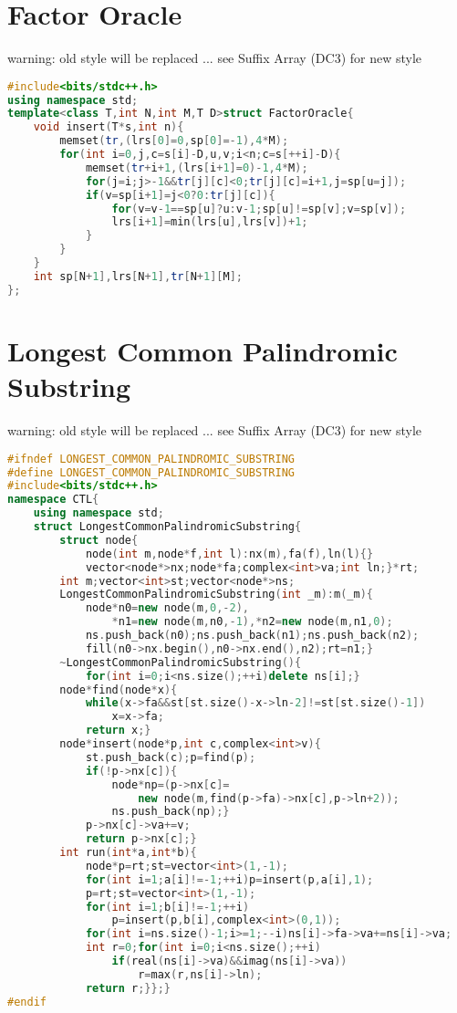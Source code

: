 \documentclass{book}
\begin{document}
\section{Factor Oracle}
warning: old style will be replaced ... see Suffix Array (DC3) for new style\begin{lstlisting}[language=C++,title={Factor Oracle.hpp (569 bytes, 16 lines)}]
#include<bits/stdc++.h>
using namespace std;
template<class T,int N,int M,T D>struct FactorOracle{
    void insert(T*s,int n){
        memset(tr,(lrs[0]=0,sp[0]=-1),4*M);
        for(int i=0,j,c=s[i]-D,u,v;i<n;c=s[++i]-D){
            memset(tr+i+1,(lrs[i+1]=0)-1,4*M);
            for(j=i;j>-1&&tr[j][c]<0;tr[j][c]=i+1,j=sp[u=j]);
            if(v=sp[i+1]=j<0?0:tr[j][c]){
                for(v=v-1==sp[u]?u:v-1;sp[u]!=sp[v];v=sp[v]);
                lrs[i+1]=min(lrs[u],lrs[v])+1;
            }
        }
    }
    int sp[N+1],lrs[N+1],tr[N+1][M];
};
\end{lstlisting}
\section{Longest Common Palindromic Substring}
warning: old style will be replaced ... see Suffix Array (DC3) for new style\begin{lstlisting}[language=C++,title={Longest Common Palindromic Substring.hpp (1752 bytes, 41 lines)}]
#ifndef LONGEST_COMMON_PALINDROMIC_SUBSTRING
#define LONGEST_COMMON_PALINDROMIC_SUBSTRING
#include<bits/stdc++.h>
namespace CTL{
    using namespace std;
    struct LongestCommonPalindromicSubstring{
        struct node{
            node(int m,node*f,int l):nx(m),fa(f),ln(l){}
            vector<node*>nx;node*fa;complex<int>va;int ln;}*rt;
        int m;vector<int>st;vector<node*>ns;
        LongestCommonPalindromicSubstring(int _m):m(_m){
            node*n0=new node(m,0,-2),
                *n1=new node(m,n0,-1),*n2=new node(m,n1,0);
            ns.push_back(n0);ns.push_back(n1);ns.push_back(n2);
            fill(n0->nx.begin(),n0->nx.end(),n2);rt=n1;}
        ~LongestCommonPalindromicSubstring(){
            for(int i=0;i<ns.size();++i)delete ns[i];}
        node*find(node*x){
            while(x->fa&&st[st.size()-x->ln-2]!=st[st.size()-1])
                x=x->fa;
            return x;}
        node*insert(node*p,int c,complex<int>v){
            st.push_back(c);p=find(p);
            if(!p->nx[c]){
                node*np=(p->nx[c]=
                    new node(m,find(p->fa)->nx[c],p->ln+2));
                ns.push_back(np);}
            p->nx[c]->va+=v;
            return p->nx[c];}
        int run(int*a,int*b){
            node*p=rt;st=vector<int>(1,-1);
            for(int i=1;a[i]!=-1;++i)p=insert(p,a[i],1);
            p=rt;st=vector<int>(1,-1);
            for(int i=1;b[i]!=-1;++i)
                p=insert(p,b[i],complex<int>(0,1));
            for(int i=ns.size()-1;i>=1;--i)ns[i]->fa->va+=ns[i]->va;
            int r=0;for(int i=0;i<ns.size();++i)
                if(real(ns[i]->va)&&imag(ns[i]->va))
                    r=max(r,ns[i]->ln);
            return r;}};}
#endif\end{lstlisting}
\end{document}
